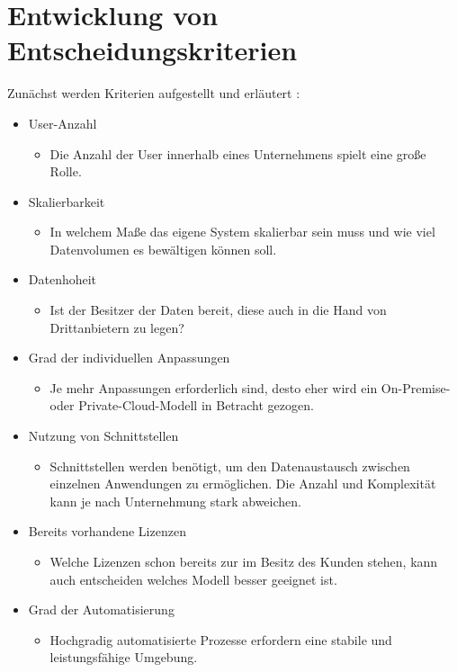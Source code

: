 \documentclass[12pt,bibtotoc]{article}
\begin{document}
			\section{Entwicklung von Entscheidungskriterien}
	Zunächst werden Kriterien aufgestellt und erläutert \cite{Anhang}\cite{Murugesan.2016}\cite{Fisher.2018}:
	\begin{itemize}
		\item User-Anzahl %
		\begin{itemize}
			\item Die Anzahl der User innerhalb eines Unternehmens spielt eine große Rolle.
		\end{itemize}
		\item Skalierbarkeit 
			\begin{itemize}
				\item In welchem Maße das eigene System skalierbar sein muss und wie viel Datenvolumen es bewältigen können soll.
			\end{itemize}
		\item Datenhoheit %
			\begin{itemize}
				\item Ist der Besitzer der Daten bereit, diese auch in die Hand von Drittanbietern zu legen?
			\end{itemize}
		\item Grad der individuellen Anpassungen %
			\begin{itemize}
				\item Je mehr Anpassungen erforderlich sind, desto eher wird ein On-Premise- oder Private-Cloud-Modell in Betracht gezogen.
			\end{itemize}
		\item Nutzung von Schnittstellen %
			\begin{itemize}
				\item Schnittstellen werden benötigt, um den Datenaustausch zwischen einzelnen Anwendungen zu ermöglichen. Die Anzahl und Komplexität kann je nach Unternehmung stark abweichen.
			\end{itemize}
		\item Bereits vorhandene Lizenzen %
			\begin{itemize}
				\item Welche Lizenzen schon bereits zur im Besitz des Kunden stehen, kann auch entscheiden welches Modell besser geeignet ist. 
			\end{itemize}
		\item Grad der Automatisierung %
			\begin{itemize}
				\item Hochgradig automatisierte Prozesse erfordern eine stabile und leistungsfähige Umgebung. 
			\end{itemize}
	\end{itemize}
\end{document}
